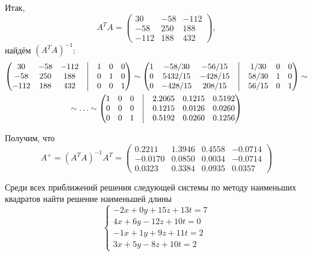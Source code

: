 Итак,
\begin{equation*}
    A^T A =
    \begin{pmatrix}
        30 & -58 & -112\\
        -58 & 250 & 188\\
        -112 & 188 & 432
    \end{pmatrix},
\end{equation*}
найдём $(A^T A)^{-1}$:
\begin{multline*}
    \begin{pmatrix}
        30 & -58 & -112 &\bigm|& 1 & 0 & 0\\
        -58 & 250 & 188 &\bigm|& 0 & 1 & 0\\
        -112 & 188 & 432 &\bigm|& 0 & 0 & 1
    \end{pmatrix}
    \sim
    \begin{pmatrix}
        1 & -58/30 & -56/15 &\bigm|& 1/30 & 0 & 0\\
        0 & 5432/15 & -428/15 &\bigm|& 58/30 & 1 & 0\\
        0 & -428/15 & 208/15 &\bigm|& 56/15 & 0 & 1
    \end{pmatrix}
    \sim \\ \sim \ldots \sim
    \begin{pmatrix}
        1 & 0 & 0 &\bigm|& 2.2065 & 0.1215 & 0.5192\\
        0 & 0 & 0 &\bigm|& 0.1215 & 0.0126 & 0.0260\\
        0 & 0 & 1 &\bigm|& 0.5192 & 0.0260 & 0.1256
    \end{pmatrix}
\end{multline*}

Получим, что
\begin{equation*}
    A^+ = (A^T A)^{-1} A^T =
    \begin{pmatrix}
        0.2211 & 1.3946 & 0.4558 & -0.0714\\
        -0.0170 & 0.0850 & 0.0034 & -0.0714\\
        0.0323 & 0.3384 & 0.0935 & 0.0357
    \end{pmatrix}
\end{equation*}
 

\newpage
\begin{problem}
    Среди всех приближений решения следующей системы по методу наименьших
    квадратов найти решение наименьшей длины
    \begin{equation*}
        \begin{cases}
            -2x + 0y + 15z + 13t = 7\\
            4x + 6y - 12z + 10t = 0\\
            -1x + 1y + 9z + 11t = 2\\
            3x + 5y - 8z + 10t = 2
        \end{cases}
    \end{equation*}
\end{problem}

